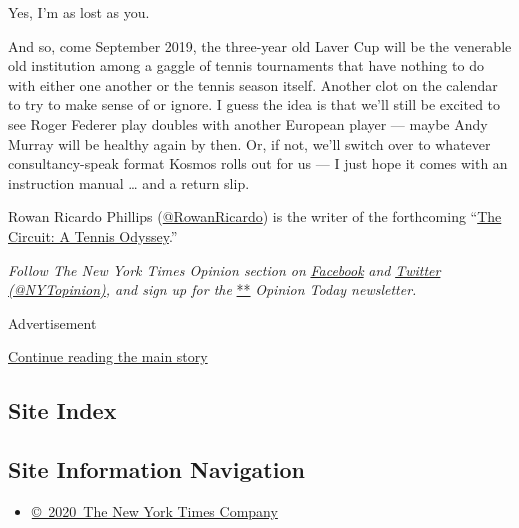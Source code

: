 Yes, I'm as lost as you.

And so, come September 2019, the three-year old Laver Cup will be the
venerable old institution among a gaggle of tennis tournaments that have
nothing to do with either one another or the tennis season itself.
Another clot on the calendar to try to make sense of or ignore. I guess
the idea is that we'll still be excited to see Roger Federer play
doubles with another European player --- maybe Andy Murray will be
healthy again by then. Or, if not, we'll switch over to whatever
consultancy-speak format Kosmos rolls out for us --- I just hope it
comes with an instruction manual \ldots{} and a return slip.

Rowan Ricardo Phillips
(\href{https://twitter.com/rowanricardo?lang=en}{@RowanRicardo}) is the
writer of the forthcoming
``\href{https://us.macmillan.com/books/9780374123772}{The Circuit: A
Tennis Odyssey}.''

\emph{Follow The New York Times Opinion section on}
\href{https://www.facebook.com/nytopinion}{\emph{Facebook}} \emph{and}
\href{http://twitter.com/NYTOpinion}{\emph{Twitter
(@NYTopinion)}}\emph{, and sign up for the}
\href{http://www.nytimes.com/newsletters/opiniontoday/}{**}
\emph{Opinion Today newsletter.}

Advertisement

\protect\hyperlink{after-bottom}{Continue reading the main story}

\hypertarget{site-index}{%
\subsection{Site Index}\label{site-index}}

\hypertarget{site-information-navigation}{%
\subsection{Site Information
Navigation}\label{site-information-navigation}}

\begin{itemize}
\tightlist
\item
  \href{https://help.nytimes.com/hc/en-us/articles/115014792127-Copyright-notice}{©~2020~The
  New York Times Company}
\end{itemize}

